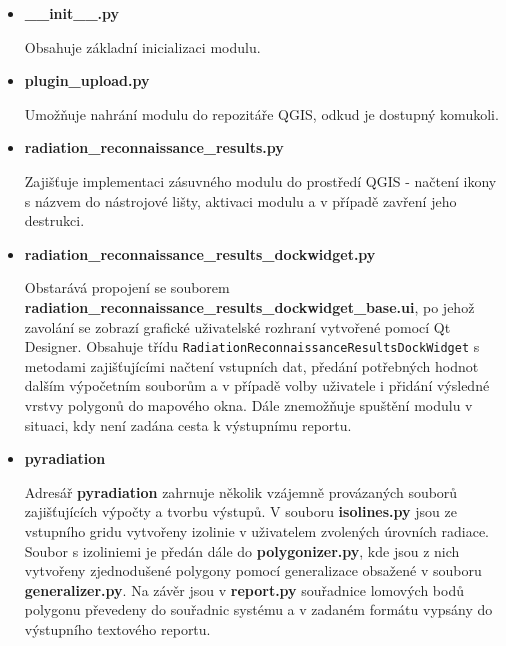 \begin{itemize}
	\item \textbf{\_\_init\_\_.py} 
	
	Obsahuje základní inicializaci modulu.
		
	\item \textbf{plugin\_upload.py} 

          Umožňuje nahrání modulu do repozitáře QGIS, odkud je
          dostupný komukoli.

	\item \textbf{radiation\_reconnaissance\_results.py} 
	
          Zajišťuje implementaci zásuvného modulu do prostředí QGIS -
          načtení ikony s názvem do nástrojové lišty, aktivaci modulu
          a v případě zavření jeho destrukci.

	\item \textbf{radiation\_reconnaissance\_results\_dockwidget.py}
	
          Obstarává propojení se souborem
          \textbf{radiation\_reconnaissance\_results\_dockwidget\_base.ui},
          po jehož zavolání se zobrazí grafické uživatelské rozhraní
          vytvořené pomocí Qt Designer. Obsahuje třídu
          \texttt{RadiationReconnaissanceResultsDockWidget} s metodami
          zajišťujícími načtení vstupních dat, předání potřebných
          hodnot dalším výpočetním souborům a v případě volby
          uživatele i přidání výsledné vrstvy polygonů do mapového
          okna. Dále znemožňuje spuštění modulu v situaci, kdy není
          zadána cesta k výstupnímu reportu.

	\item \textbf{pyradiation}
		
          Adresář \textbf{pyradiation} zahrnuje několik vzájemně
          provázaných souborů zajišťujících výpočty a tvorbu
          výstupů. V souboru \textbf{isolines.py} jsou ze vstupního
          gridu vytvořeny izolinie v uživatelem zvolených úrovních
          radiace. Soubor s izoliniemi je předán dále do
          \textbf{polygonizer.py}, kde jsou z nich vytvořeny
          zjednodušené polygony pomocí generalizace obsažené v souboru
          \textbf{generalizer.py}. Na závěr jsou v \textbf{report.py}
          souřadnice lomových bodů polygonu převedeny do souřadnic
          systému  a v zadaném formátu vypsány do výstupního
          textového reportu.
	
\end{itemize}

